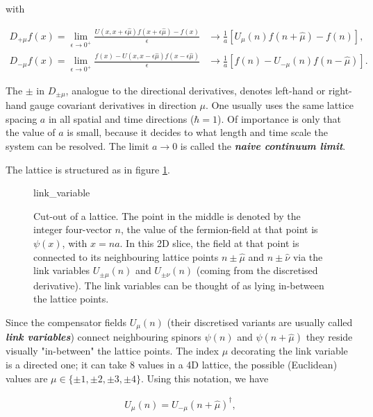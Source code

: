 \documentclass{article}
\theoremstyle{plain} %
\theoremstyle{convention} %
\theoremstyle{remark} %
\def\df#1{\textbf{\textit{#1}}}
\numberwithin{equation}{section}
\begin{document}
with 

\begin{align*}
    D_{+\mu} f(x) = \lim_{\epsilon \to 0^{+}} \frac{ U(x,x + \epsilon \hat{\mu}) f(x + \epsilon \hat{\mu}) - f(x) }{\epsilon} &\longrightarrow \frac{1}{a} \left[ U_{\mu}(n) f(n + \hat{\mu}) - f(n) \right], \\
    D_{-\mu} f(x) = \lim_{\epsilon \to 0^{+}} \frac{ f(x) - U(x,x - \epsilon \hat{\mu}) f(x - \epsilon \hat{\mu}) }{\epsilon} &\longrightarrow \frac{1}{a} \left[ f(n) - U_{-\mu}(n) f(n - \hat{\mu}) \right].
\end{align*}

The $\pm$ in $D_{\pm \mu}$, analogue to the directional derivatives, denotes left-hand or right-hand gauge covariant derivatives in direction $\mu$. One usually uses the same lattice spacing $a$ in all spatial and time directions ($\hbar = 1$). Of importance is only that the value of $a$ is small, because it decides to what length and time scale the system can be resolved. The limit $a \to 0$ is called the \df {naive continuum limit}.

The lattice is structured as in figure \ref{fig:link_variable}.

\begin{figure}[H]
  \centering
  {link_variable}
  \caption{Cut-out of a lattice. The point in the middle is denoted by the integer four-vector \textcolor{cblue}{$n$}, the value of the fermion-field at that point is $\psi(x)$, with $x=na$. In this 2D slice, the field at that point is connected to its neighbouring lattice points \textcolor{cblue}{$n \pm \hat{\mu}$} and \textcolor{cblue}{$n \pm \hat{\nu}$} via the link variables \textcolor{cred}{$U_{\pm\mu}(n)$} and \textcolor{cgreen}{$U_{\pm\nu}(n)$} (coming from the discretised derivative). The link variables can be thought of as lying in-between the lattice points.}
  \label{fig:link_variable}
\end{figure}

Since the compensator fields $U_{\mu}(n)$ (their discretised variants are usually called \df{link variables}) connect neighbouring spinors $\psi(n)$ and $\psi(n + \hat{\mu})$ they reside visually "in-between" the lattice points. The index $\mu$ decorating the link variable is a directed one; it can take 8 values in a 4D lattice, the possible (Euclidean) values are $\mu \in \{\pm 1, \pm 2, \pm 3, \pm 4\}$. Using this notation, we have

\begin{align}
    U_{\mu}(n) = U_{-\mu}(n + \hat{\mu})^{\dagger}, \label{eq:U_relation}
\end{align}
\end{document}
